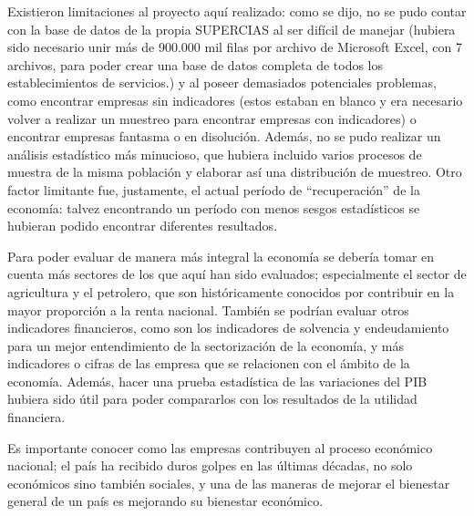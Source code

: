 \documentclass[12pt,a4paper,twoside]{article}
\begin{document}
Existieron limitaciones al proyecto aquí realizado: como se dijo, no se pudo contar con la base de datos de la propia SUPERCIAS al ser difícil de manejar (hubiera sido necesario unir más de 900.000 mil filas por archivo de Microsoft Excel, con 7 archivos, para poder crear una base de datos completa de todos los establecimientos de servicios.) y al poseer demasiados potenciales problemas, como encontrar empresas sin indicadores (estos estaban en blanco y era necesario volver a realizar un muestreo para encontrar empresas con indicadores) o encontrar empresas fantasma o en disolución. Además, no se pudo realizar un análisis estadístico más minucioso, que hubiera incluido varios procesos de muestra de la misma población y elaborar así una distribución de muestreo. Otro factor limitante fue, justamente, el actual período de ``recuperación'' de la economía: talvez encontrando un período con menos sesgos estadísticos se hubieran podido encontrar diferentes resultados. 

Para poder evaluar de manera más integral la economía se debería tomar en cuenta más sectores de los que aquí han sido evaluados; especialmente el sector de agricultura y el petrolero, que son históricamente conocidos por contribuir en la mayor proporción a la renta nacional. También se podrían evaluar otros indicadores financieros, como son los indicadores de solvencia y endeudamiento para un mejor entendimiento de la sectorización de la economía, y más indicadores o cifras de las empresa que se relacionen con el ámbito de la economía. Además, hacer una prueba estadística de las variaciones del PIB hubiera sido útil para poder compararlos con los resultados de la utilidad financiera. 

Es importante conocer como las empresas contribuyen al proceso económico nacional; el país ha recibido duros golpes en las últimas décadas, no solo económicos sino también sociales, y una de las maneras de mejorar el bienestar general de un país es mejorando su bienestar económico.
\clearpage

\printbibliography
\end{document}
